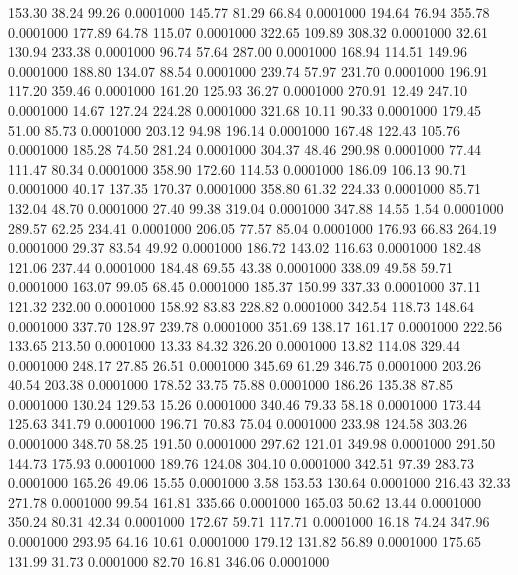  153.30   38.24   99.26   0.0001000
 145.77   81.29   66.84   0.0001000
 194.64   76.94  355.78   0.0001000
 177.89   64.78  115.07   0.0001000
 322.65  109.89  308.32   0.0001000
  32.61  130.94  233.38   0.0001000
  96.74   57.64  287.00   0.0001000
 168.94  114.51  149.96   0.0001000
 188.80  134.07   88.54   0.0001000
 239.74   57.97  231.70   0.0001000
 196.91  117.20  359.46   0.0001000
 161.20  125.93   36.27   0.0001000
 270.91   12.49  247.10   0.0001000
  14.67  127.24  224.28   0.0001000
 321.68   10.11   90.33   0.0001000
 179.45   51.00   85.73   0.0001000
 203.12   94.98  196.14   0.0001000
 167.48  122.43  105.76   0.0001000
 185.28   74.50  281.24   0.0001000
 304.37   48.46  290.98   0.0001000
  77.44  111.47   80.34   0.0001000
 358.90  172.60  114.53   0.0001000
 186.09  106.13   90.71   0.0001000
  40.17  137.35  170.37   0.0001000
 358.80   61.32  224.33   0.0001000
  85.71  132.04   48.70   0.0001000
  27.40   99.38  319.04   0.0001000
 347.88   14.55    1.54   0.0001000
 289.57   62.25  234.41   0.0001000
 206.05   77.57   85.04   0.0001000
 176.93   66.83  264.19   0.0001000
  29.37   83.54   49.92   0.0001000
 186.72  143.02  116.63   0.0001000
 182.48  121.06  237.44   0.0001000
 184.48   69.55   43.38   0.0001000
 338.09   49.58   59.71   0.0001000
 163.07   99.05   68.45   0.0001000
 185.37  150.99  337.33   0.0001000
  37.11  121.32  232.00   0.0001000
 158.92   83.83  228.82   0.0001000
 342.54  118.73  148.64   0.0001000
 337.70  128.97  239.78   0.0001000
 351.69  138.17  161.17   0.0001000
 222.56  133.65  213.50   0.0001000
  13.33   84.32  326.20   0.0001000
  13.82  114.08  329.44   0.0001000
 248.17   27.85   26.51   0.0001000
 345.69   61.29  346.75   0.0001000
 203.26   40.54  203.38   0.0001000
 178.52   33.75   75.88   0.0001000
 186.26  135.38   87.85   0.0001000
 130.24  129.53   15.26   0.0001000
 340.46   79.33   58.18   0.0001000
 173.44  125.63  341.79   0.0001000
 196.71   70.83   75.04   0.0001000
 233.98  124.58  303.26   0.0001000
 348.70   58.25  191.50   0.0001000
 297.62  121.01  349.98   0.0001000
 291.50  144.73  175.93   0.0001000
 189.76  124.08  304.10   0.0001000
 342.51   97.39  283.73   0.0001000
 165.26   49.06   15.55   0.0001000
   3.58  153.53  130.64   0.0001000
 216.43   32.33  271.78   0.0001000
  99.54  161.81  335.66   0.0001000
 165.03   50.62   13.44   0.0001000
 350.24   80.31   42.34   0.0001000
 172.67   59.71  117.71   0.0001000
  16.18   74.24  347.96   0.0001000
 293.95   64.16   10.61   0.0001000
 179.12  131.82   56.89   0.0001000
 175.65  131.99   31.73   0.0001000
  82.70   16.81  346.06   0.0001000
